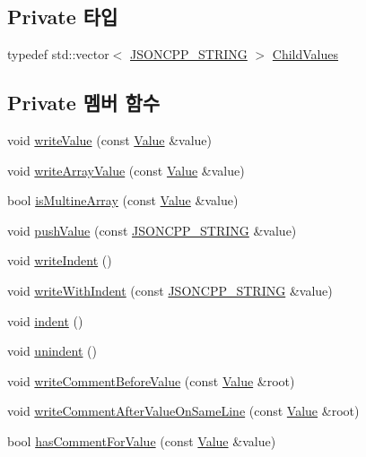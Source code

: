 \subsection*{Private 타입}
\begin{DoxyCompactItemize}
\item 
typedef std\+::vector$<$ \hyperlink{json_8h_a1e723f95759de062585bc4a8fd3fa4be}{J\+S\+O\+N\+C\+P\+P\+\_\+\+S\+T\+R\+I\+NG} $>$ \hyperlink{class_json_1_1_styled_writer_a798fcefa41730de612a5cf7e73003e8a}{Child\+Values}
\end{DoxyCompactItemize}
\subsection*{Private 멤버 함수}
\begin{DoxyCompactItemize}
\item 
void \hyperlink{class_json_1_1_styled_writer_ac40143cf43f7c4a94d3d0b41e5245069}{write\+Value} (const \hyperlink{class_json_1_1_value}{Value} \&value)
\item 
void \hyperlink{class_json_1_1_styled_writer_a0618c23d62965515def15ece1e677f5d}{write\+Array\+Value} (const \hyperlink{class_json_1_1_value}{Value} \&value)
\item 
bool \hyperlink{class_json_1_1_styled_writer_aa5dc671edf10b9976f1511da2271ab9d}{is\+Multine\+Array} (const \hyperlink{class_json_1_1_value}{Value} \&value)
\item 
void \hyperlink{class_json_1_1_styled_writer_a236a833b4bdaa09915c2cac715970f08}{push\+Value} (const \hyperlink{json_8h_a1e723f95759de062585bc4a8fd3fa4be}{J\+S\+O\+N\+C\+P\+P\+\_\+\+S\+T\+R\+I\+NG} \&value)
\item 
void \hyperlink{class_json_1_1_styled_writer_a885f4bfb5701896d60eee6716d2db7e4}{write\+Indent} ()
\item 
void \hyperlink{class_json_1_1_styled_writer_ac38e02972054125c38efbe327b52f6ac}{write\+With\+Indent} (const \hyperlink{json_8h_a1e723f95759de062585bc4a8fd3fa4be}{J\+S\+O\+N\+C\+P\+P\+\_\+\+S\+T\+R\+I\+NG} \&value)
\item 
void \hyperlink{class_json_1_1_styled_writer_a0b65be6186a7c6638270990265e42b97}{indent} ()
\item 
void \hyperlink{class_json_1_1_styled_writer_acee1c9285519b573cfcb00b7e7f5a809}{unindent} ()
\item 
void \hyperlink{class_json_1_1_styled_writer_ad3452c48fabf968bf3693549331ec06e}{write\+Comment\+Before\+Value} (const \hyperlink{class_json_1_1_value}{Value} \&root)
\item 
void \hyperlink{class_json_1_1_styled_writer_ab12b274c62822fc51ec4617c6be95139}{write\+Comment\+After\+Value\+On\+Same\+Line} (const \hyperlink{class_json_1_1_value}{Value} \&root)
\item 
bool \hyperlink{class_json_1_1_styled_writer_a37a806d010f708cb68556f2666f79bdf}{has\+Comment\+For\+Value} (const \hyperlink{class_json_1_1_value}{Value} \&value)
\end{DoxyCompactItemize}
